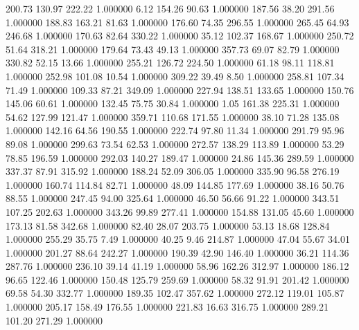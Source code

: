     200.73    130.97    222.22  1.000000
      6.12    154.26     90.63  1.000000
    187.56     38.20    291.56  1.000000
    188.83    163.21     81.63  1.000000
    176.60     74.35    296.55  1.000000
    265.45     64.93    246.68  1.000000
    170.63     82.64    330.22  1.000000
     35.12    102.37    168.67  1.000000
    250.72     51.64    318.21  1.000000
    179.64     73.43     49.13  1.000000
    357.73     69.07     82.79  1.000000
    330.82     52.15     13.66  1.000000
    255.21    126.72    224.50  1.000000
     61.18     98.11    118.81  1.000000
    252.98    101.08     10.54  1.000000
    309.22     39.49      8.50  1.000000
    258.81    107.34     71.49  1.000000
    109.33     87.21    349.09  1.000000
    227.94    138.51    133.65  1.000000
    150.76    145.06     60.61  1.000000
    132.45     75.75     30.84  1.000000
      1.05    161.38    225.31  1.000000
     54.62    127.99    121.47  1.000000
    359.71    110.68    171.55  1.000000
     38.10     71.28    135.08  1.000000
    142.16     64.56    190.55  1.000000
    222.74     97.80     11.34  1.000000
    291.79     95.96     89.08  1.000000
    299.63     73.54     62.53  1.000000
    272.57    138.29    113.89  1.000000
     53.29     78.85    196.59  1.000000
    292.03    140.27    189.47  1.000000
     24.86    145.36    289.59  1.000000
    337.37     87.91    315.92  1.000000
    188.24     52.09    306.05  1.000000
    335.90     96.58    276.19  1.000000
    160.74    114.84     82.71  1.000000
     48.09    144.85    177.69  1.000000
     38.16     50.76     88.55  1.000000
    247.45     94.00    325.64  1.000000
     46.50     56.66     91.22  1.000000
    343.51    107.25    202.63  1.000000
    343.26     99.89    277.41  1.000000
    154.88    131.05     45.60  1.000000
    173.13     81.58    342.68  1.000000
     82.40     28.07    203.75  1.000000
     53.13     18.68    128.84  1.000000
    255.29     35.75      7.49  1.000000
     40.25      9.46    214.87  1.000000
     47.04     55.67     34.01  1.000000
    201.27     88.64    242.27  1.000000
    190.39     42.90    146.40  1.000000
     36.21    114.36    287.76  1.000000
    236.10     39.14     41.19  1.000000
     58.96    162.26    312.97  1.000000
    186.12     96.65    122.46  1.000000
    150.48    125.79    259.69  1.000000
     58.32     91.91    201.42  1.000000
     69.58     54.30    332.77  1.000000
    189.35    102.47    357.62  1.000000
    272.12    119.01    105.87  1.000000
    205.17    158.49    176.55  1.000000
    221.83     16.63    316.75  1.000000
    289.21    101.20    271.29  1.000000
